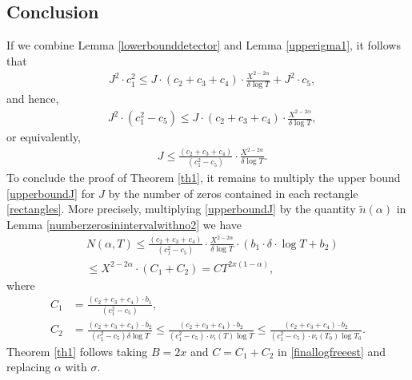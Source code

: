 \documentclass[reqno]{amsart}
\numberwithin{equation}{section}
\theoremstyle{remark}
\begin{document}
\subsection{Conclusion} If we combine Lemma \ref{lowerbounddetector} and Lemma \ref{upperigma1}, it follows that
\begin{equation*}
    \begin{aligned}
        &J^2\cdot c_1^2  \le   J\cdot (c_2+c_3+c_4)\cdot  \frac{ X^{2-2\alpha}}{\delta\log T}+J^2\cdot  c_5,
    \end{aligned}
\end{equation*}
and hence,
\begin{equation*}
    \begin{aligned}
        &J^2\cdot (c_1^2-c_5)  \le   J\cdot (c_2+c_3+c_4)\cdot  \frac{ X^{2-2\alpha}}{\delta\log T},
    \end{aligned}
\end{equation*}
or equivalently,
\begin{equation}\label{upperboundJ}
    \begin{aligned}
        &J  \le  \frac{(c_2+c_3+c_4)}{(c_1^2-c_5)}\cdot  \frac{ X^{2-2\alpha}}{\delta\log T}.
    \end{aligned}
\end{equation}
To conclude the proof of Theorem \ref{th1}, it remains to multiply the upper bound \eqref{upperboundJ} for $J$ by the number of zeros contained in each rectangle \eqref{rectangles}. More precisely, multiplying \eqref{upperboundJ} by the quantity $\tilde{n}(\alpha)$ in Lemma \ref{numberzerosinintervalwithno2} we have
\begin{equation}\label{finallogfreeest}
    \begin{aligned}
        &N(\alpha,T)\le \frac{(c_2+c_3+c_4)}{(c_1^2-c_5)}\cdot  \frac{ X^{2-2\alpha}}{\delta\log T}\cdot (b_1\cdot \delta\cdot \log T+b_2)\\&\le X^{2-2\alpha}\cdot\left(C_1+C_2\right)= CT^{2x(1-\alpha)},
    \end{aligned}
\end{equation}
where
\begin{equation*}
    \begin{aligned}
        C_1&=\frac{(c_2+c_3+c_4)\cdot b_1}{(c_1^2-c_5)},\\
        C_2&=\frac{(c_2+c_3+c_4)\cdot b_2}{(c_1^2-c_5)\delta\log T}\le \frac{(c_2+c_3+c_4)\cdot b_2}{(c_1^2-c_5)\cdot \nu_i(T)\log T}\le \frac{(c_2+c_3+c_4)\cdot b_2}{(c_1^2-c_5)\cdot \nu_i(T_0)\log T_0}.
    \end{aligned}
\end{equation*}
Theorem \ref{th1} follows taking $B=2x$ and $C=C_1+C_2$ in \eqref{finallogfreeest} and replacing $\alpha$ with $\sigma$.
\end{document}
